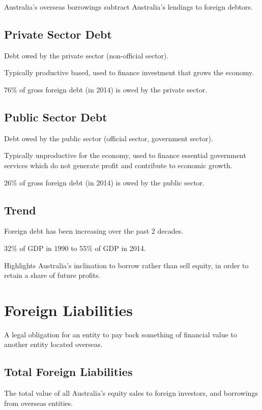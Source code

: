 \documentclass[a4paper,11pt]{report}
\begin{document}
Australia's overseas borrowings subtract Australia's lendings to foreign
debtors.

\subsection{Private Sector Debt}

Debt owed by the private sector (non-official sector).

Typically productive based, used to finance investment that grows the
economy.

76\% of gross foreign debt (in 2014) is owed by the private sector.

\subsection{Public Sector Debt}

Debt owed by the public sector (official sector, government sector).

Typically unproductive for the economy, used to finance essential government
services which do not generate profit and contribute to economic growth.

26\% of gross foreign debt (in 2014) is owed by the public sector.

\subsection{Trend}

Foreign debt has been increasing over the past 2 decades.

32\% of GDP in 1990 to 55\% of GDP in 2014.

Highlights Australia's inclination to borrow rather than sell equity, in order
to retain a share of future profits.


\section{Foreign Liabilities}

A legal obligation for an entity to pay back something of financial value to
another entity located overseas.

\subsection{Total Foreign Liabilities}

The total value of all Australia's equity sales to foreign investors, and
borrowings from overseas entities.
\end{document}
